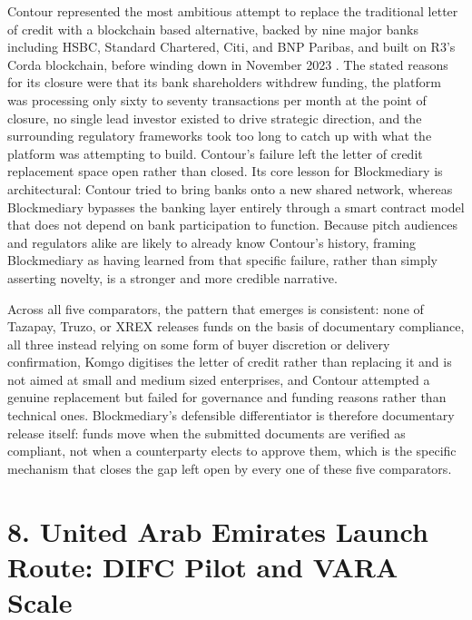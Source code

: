 \documentclass[12pt, a4paper]{article}
\begin{document}
Contour represented the most ambitious attempt to replace the traditional letter of credit
with a blockchain based alternative, backed by nine major banks including HSBC, Standard
Chartered, Citi, and BNP Paribas, and built on R3's Corda blockchain, before winding down
in November 2023 \citep{contour2023}. The stated reasons for its closure were that its
bank shareholders withdrew funding, the platform was processing only sixty to seventy
transactions per month at the point of closure, no single lead investor existed to drive
strategic direction, and the surrounding regulatory frameworks took too long to catch up
with what the platform was attempting to build. Contour's failure left the letter of
credit replacement space open rather than closed. Its core lesson for Blockmediary is
architectural: Contour tried to bring banks onto a new shared network, whereas Blockmediary
bypasses the banking layer entirely through a smart contract model that does not depend on
bank participation to function. Because pitch audiences and regulators alike are likely to
already know Contour's history, framing Blockmediary as having learned from that specific
failure, rather than simply asserting novelty, is a stronger and more credible narrative.

Across all five comparators, the pattern that emerges is consistent: none of Tazapay,
Truzo, or XREX releases funds on the basis of documentary compliance, all three instead
relying on some form of buyer discretion or delivery confirmation, Komgo digitises the
letter of credit rather than replacing it and is not aimed at small and medium sized
enterprises, and Contour attempted a genuine replacement but failed for governance and
funding reasons rather than technical ones. Blockmediary's defensible differentiator is
therefore documentary release itself: funds move when the submitted documents are verified
as compliant, not when a counterparty elects to approve them, which is the specific
mechanism that closes the gap left open by every one of these five comparators.

\section*{8. United Arab Emirates Launch Route: DIFC Pilot and VARA Scale}
\end{document}
